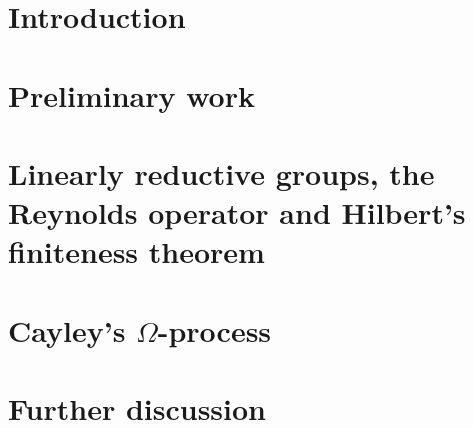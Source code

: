 \documentclass[a4paper]{article}
\theoremstyle{prrt}
\begin{document}


\newpage

\tableofcontents
\vfill

\section{Introduction}


\newpage

\section{Preliminary work}\label{pw}



\section{Linearly reductive groups, the Reynolds operator and Hilbert's finiteness theorem}



\section{Cayley's $\Omega$-process}



\section{Further discussion}



\newpage

% 
%
% 


\end{document}
